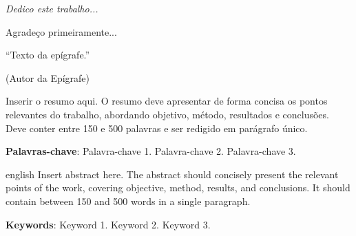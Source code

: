 \documentclass[
    12pt,
    oneside,
    a4paper,
    chapter=TITLE,
    section=TITLE,
    english,
    brazil
]{abntex2}
\begin{document}
\frenchspacing

\pretextual

\imprimircapa

\imprimirfolhaderosto*

\begin{dedicatoria}
   \vspace*{\fill}
   \centering
   \noindent
   \textit{Dedico este trabalho...}
   \vspace*{\fill}
\end{dedicatoria}

\begin{agradecimentos}
Agradeço primeiramente...
\end{agradecimentos}

\begin{epigrafe}
    \vspace*{\fill}
    \begin{citacao}
        ``Texto da epígrafe.''
        \par
        (Autor da Epígrafe)
    \end{citacao}
\end{epigrafe}

\setlength{\absparsep}{18pt}
\begin{resumo}
Inserir o resumo aqui. O resumo deve apresentar de forma concisa os pontos
relevantes do trabalho, abordando objetivo, método, resultados e conclusões.
Deve conter entre 150 e 500 palavras e ser redigido em parágrafo único.

\textbf{Palavras-chave}: Palavra-chave 1. Palavra-chave 2. Palavra-chave 3.
\end{resumo}

\begin{resumo}[Abstract]
\begin{otherlanguage*}{english}
Insert abstract here. The abstract should concisely present the relevant
points of the work, covering objective, method, results, and conclusions.
It should contain between 150 and 500 words in a single paragraph.

\textbf{Keywords}: Keyword 1. Keyword 2. Keyword 3.
\end{otherlanguage*}
\end{resumo}

\listoffigures*
\cleardoublepage
\end{document}
